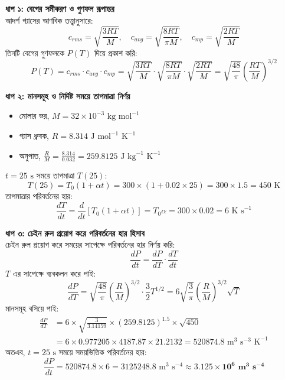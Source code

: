\documentclass[12pt, a4paper]{article}
\begin{document}
\begin{tcolorbox}[solutionbox={সমাধান (Solution)}]
    \noindent
    \textbf{ধাপ ১: বেগের সমীকরণ ও গুণফল রূপান্তর} \\
    আদর্শ গ্যাসের আণবিক তত্ত্বানুসারে:
    \[ c_{rms} = \sqrt{\frac{3RT}{M}}, \quad c_{avg} = \sqrt{\frac{8RT}{\pi M}}, \quad c_{mp} = \sqrt{\frac{2RT}{M}} \]
    তিনটি বেগের গুণফলকে $P(T)$ দিয়ে প্রকাশ করি:
    \[ P(T) = c_{rms} \cdot c_{avg} \cdot c_{mp} = \sqrt{\frac{3 R T}{M}} \cdot \sqrt{\frac{8 R T}{\pi M}} \cdot \sqrt{\frac{2 R T}{M}} = \sqrt{\frac{48}{\pi}} \left(\frac{R T}{M}\right)^{3/2} \]
    
    \vspace{0.4em}
    \noindent\textbf{ধাপ ২: মানসমূহ ও নির্দিষ্ট সময়ে তাপমাত্রা নির্ণয়}
    \begin{itemize}[leftmargin=1.5em, itemsep=0.2em]
        \item মোলার ভর, $M = 32 \times 10^{-3}\text{ kg mol}^{-1}$
        \item গ্যাস ধ্রুবক, $R = 8.314\text{ J mol}^{-1}\text{ K}^{-1}$
        \item অনুপাত, $\frac{R}{M} = \frac{8.314}{0.032} = 259.8125\text{ J kg}^{-1}\text{ K}^{-1}$
    \end{itemize}
    $t = 25\text{ s}$ সময়ে তাপমাত্রা $T(25)$:
    \[ T(25) = T_0 (1 + \alpha t) = 300 \times (1 + 0.02 \times 25) = 300 \times 1.5 = 450\text{ K} \]
    তাপমাত্রার পরিবর্তনের হার:
    \[ \frac{dT}{dt} = \frac{d}{dt} [T_0 (1 + \alpha t)] = T_0 \alpha = 300 \times 0.02 = 6\text{ K s}^{-1} \]
    
    \vspace{0.4em}
    \noindent\textbf{ধাপ ৩: চেইন রুল প্রয়োগ করে পরিবর্তনের হার হিসাব} \\
    চেইন রুল প্রয়োগ করে সময়ের সাপেক্ষে পরিবর্তনের হার নির্ণয় করি:
    \[ \frac{dP}{dt} = \frac{dP}{dT} \cdot \frac{dT}{dt} \]
    $T$ এর সাপেক্ষে ব্যবকলন করে পাই:
    \[ \frac{dP}{dT} = \sqrt{\frac{48}{\pi}} \left(\frac{R}{M}\right)^{3/2} \cdot \frac{3}{2} T^{1/2} = 6 \sqrt{\frac{3}{\pi}} \left(\frac{R}{M}\right)^{3/2} \sqrt{T} \]
    মানসমূহ বসিয়ে পাই:
    \begin{align*}
        \frac{dP}{dT} &= 6 \times \sqrt{\frac{3}{3.14159}} \times (259.8125)^{1.5} \times \sqrt{450} \\
        &= 6 \times 0.977205 \times 4187.87 \times 21.2132 = 520874.8\text{ m}^3\text{ s}^{-3}\text{ K}^{-1}
    \end{align*}
    অতএব, $t = 25\text{ s}$ সময়ে সময়ভিত্তিক পরিবর্তনের হার:
    \[ \frac{dP}{dt} = 520874.8 \times 6 = 3125248.8\text{ m}^3\text{ s}^{-4} \approx \mathbf{3.125 \times 10^6\text{ m}^3\text{ s}^{-4}} \]
\end{tcolorbox}
\end{document}
